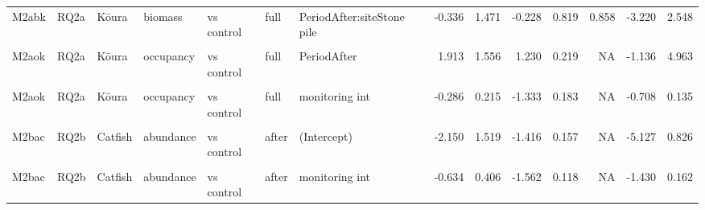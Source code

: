 \documentclass[
  12pt,
  a4paper,
  oneside]{scrbook}
\begin{document}
\begin{landscape}
\begin{longtable}[t]{lllllllrrrrrrr}
\addlinespace
M2abk & RQ2a & Kōura & biomass & vs control & full & PeriodAfter:siteStone pile & -0.336 & 1.471 & -0.228 & 0.819 & 0.858 & -3.220 & 2.548\\
\cellcolor{gray!8}{M2aok} & \cellcolor{gray!8}{RQ2a} & \cellcolor{gray!8}{Kōura} & \cellcolor{gray!8}{occupancy} & \cellcolor{gray!8}{vs control} & \cellcolor{gray!8}{full} & \cellcolor{gray!8}{(Intercept)} & \cellcolor{gray!8}{-0.690} & \cellcolor{gray!8}{1.643} & \cellcolor{gray!8}{-0.420} & \cellcolor{gray!8}{0.674} & \cellcolor{gray!8}{NA} & \cellcolor{gray!8}{-3.911} & \cellcolor{gray!8}{2.530}\\
M2aok & RQ2a & Kōura & occupancy & vs control & full & PeriodAfter & 1.913 & 1.556 & 1.230 & 0.219 & NA & -1.136 & 4.963\\
\cellcolor{gray!8}{M2aok} & \cellcolor{gray!8}{RQ2a} & \cellcolor{gray!8}{Kōura} & \cellcolor{gray!8}{occupancy} & \cellcolor{gray!8}{vs control} & \cellcolor{gray!8}{full} & \cellcolor{gray!8}{siteStone pile} & \cellcolor{gray!8}{0.013} & \cellcolor{gray!8}{2.121} & \cellcolor{gray!8}{0.006} & \cellcolor{gray!8}{0.995} & \cellcolor{gray!8}{NA} & \cellcolor{gray!8}{-4.144} & \cellcolor{gray!8}{4.171}\\
M2aok & RQ2a & Kōura & occupancy & vs control & full & monitoring int & -0.286 & 0.215 & -1.333 & 0.183 & NA & -0.708 & 0.135\\
\addlinespace
\cellcolor{gray!8}{M2aok} & \cellcolor{gray!8}{RQ2a} & \cellcolor{gray!8}{Kōura} & \cellcolor{gray!8}{occupancy} & \cellcolor{gray!8}{vs control} & \cellcolor{gray!8}{full} & \cellcolor{gray!8}{PeriodAfter:siteStone pile} & \cellcolor{gray!8}{1.013} & \cellcolor{gray!8}{1.762} & \cellcolor{gray!8}{0.575} & \cellcolor{gray!8}{0.565} & \cellcolor{gray!8}{0.858} & \cellcolor{gray!8}{-2.440} & \cellcolor{gray!8}{4.466}\\
M2bac & RQ2b & Catfish & abundance & vs control & after & (Intercept) & -2.150 & 1.519 & -1.416 & 0.157 & NA & -5.127 & 0.826\\
\cellcolor{gray!8}{M2bac} & \cellcolor{gray!8}{RQ2b} & \cellcolor{gray!8}{Catfish} & \cellcolor{gray!8}{abundance} & \cellcolor{gray!8}{vs control} & \cellcolor{gray!8}{after} & \cellcolor{gray!8}{siteStone pile} & \cellcolor{gray!8}{-1.392} & \cellcolor{gray!8}{1.832} & \cellcolor{gray!8}{-0.760} & \cellcolor{gray!8}{0.447} & \cellcolor{gray!8}{NA} & \cellcolor{gray!8}{-4.983} & \cellcolor{gray!8}{2.199}\\
M2bac & RQ2b & Catfish & abundance & vs control & after & monitoring int & -0.634 & 0.406 & -1.562 & 0.118 & NA & -1.430 & 0.162\\

\end{longtable}
\end{landscape}
\end{document}
